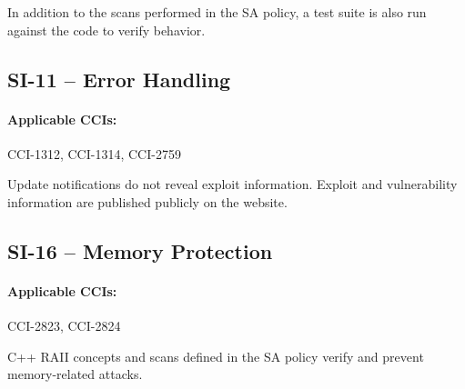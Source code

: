 \documentclass[letterpaper, 10pt, twoside]{article}
\begin{document}
In addition to the scans performed in the SA policy, a test suite is also run against the code to verify behavior.

\subsection{SI-11 -- Error Handling}

\paragraph{Applicable CCIs:} CCI-1312, CCI-1314, CCI-2759

Update notifications do not reveal exploit information. Exploit and vulnerability information are published publicly on the website.

\subsection{SI-16 -- Memory Protection}

\paragraph{Applicable CCIs:} CCI-2823, CCI-2824

C++ RAII concepts and scans defined in the SA policy verify and prevent memory-related attacks.

\clearpage
\printbibliography
\end{document}
